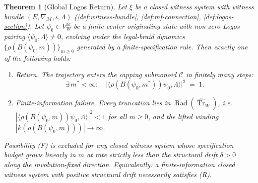 \documentclass[11pt,a4paper]{article}
\theoremstyle{plain}
\newtheorem{theorem}{Theorem}[section]
\theoremstyle{definition}
\theoremstyle{remark}
\numberwithin{equation}{section}
\DeclareMathOperator{\Tr}{Tr}
\DeclareMathOperator{\Rad}{Rad}
\begin{document}
\begin{theorem}[Global Logos Return]
\label{thm:global-logos-return}
Let $\xi$ be a closed witness system with witness bundle
$(E,\nabla_{\mathcal{M}},\iota,\Lambda)$
(\cref{def:witness-bundle},
\cref{def:mf-connection},
\cref{def:logos-section}).  Let $\psi_0\in V_W^{\mathrm{ac}}$ be a
finite center-originating state with non-zero Logos pairing
$\langle\psi_0,\Lambda\rangle\ne 0$, evolving under the legal-braid
dynamics $\{\rho(B(\psi_0,m))\}_{m\ge 0}$ generated by a
finite-specification rule.  Then exactly one of the following
holds:
\begin{enumerate}
  \item[\textup{(R)}] \emph{Return.}  The trajectory enters the
        capping submonoid $\mathcal{C}$ in finitely many steps:
        \[
          \exists\,m^{*}<\infty:\quad
          \bigl|\langle\rho(B(\psi_0,m^{*}))\psi_0,\Lambda\rangle\bigr|^2
          \;=\;1.
        \]
  \item[\textup{(F)}] \emph{Finite-information failure.}  Every
        truncation lies in
        $\widetilde{\Rad}(\widehat{\Tr}_W)$, i.e.\
        $|\langle\rho(B(\psi_0,m))\psi_0,\Lambda\rangle|^2<1$ for
        all $m\ge 0$, and the lifted winding
        $|k(\rho(B(\psi_0,m)))|\to\infty$.
\end{enumerate}
Possibility (F) is excluded for any closed witness system whose
specification budget grows linearly in $m$ at rate strictly less
than the structural drift $\delta>0$ along the involution-fixed
direction.  Equivalently: a finite-information closed witness
system with positive structural drift necessarily satisfies (R).
\end{theorem}
\end{document}
